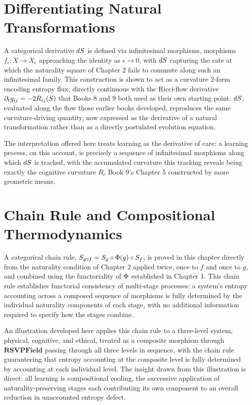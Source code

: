 \chapter{Differentiating Natural Transformations}

A categorical derivative $dS$ is defined via infinitesimal morphisms, morphisms $f_\epsilon: X \to X_\epsilon$ approaching the identity as $\epsilon \to 0$, with $dS$ capturing the rate at which the naturality square of Chapter 2 fails to commute along such an infinitesimal family. This construction is shown to act as a curvature 2-form encoding entropy flux, directly continuous with the Ricci-flow derivative $\partial_t g_{ij} = -2R_{ij}(S)$ that Books 8 and 9 both used as their own starting point: $dS$, evaluated along the flow those earlier books developed, reproduces the same curvature-driving quantity, now expressed as the derivative of a natural transformation rather than as a directly postulated evolution equation.

The interpretation offered here treats learning as the derivative of care: a learning process, on this account, is precisely a sequence of infinitesimal morphisms along which $dS$ is tracked, with the accumulated curvature this tracking reveals being exactly the cognitive curvature $R_c$ Book 9's Chapter 5 constructed by more geometric means.

\chapter{Chain Rule and Compositional Thermodynamics}

A categorical chain rule, $S_{g \circ f} = S_g \circ \Phi(g) \circ S_f$, is proved in this chapter directly from the naturality condition of Chapter 2 applied twice, once to $f$ and once to $g$, and combined using the functoriality of $\Phi$ established in Chapter 1. This chain rule establishes functorial consistency of multi-stage processes: a system's entropy accounting across a composed sequence of morphisms is fully determined by the individual naturality components of each stage, with no additional information required to specify how the stages combine.

An illustration developed here applies this chain rule to a three-level system, physical, cognitive, and ethical, treated as a composite morphism through $\mathbf{RSVPField}$ passing through all three levels in sequence, with the chain rule guaranteeing that entropy accounting at the composite level is fully determined by accounting at each individual level. The insight drawn from this illustration is direct: all learning is compositional cooling, the successive application of naturality-preserving stages each contributing its own component to an overall reduction in unaccounted entropy defect.

